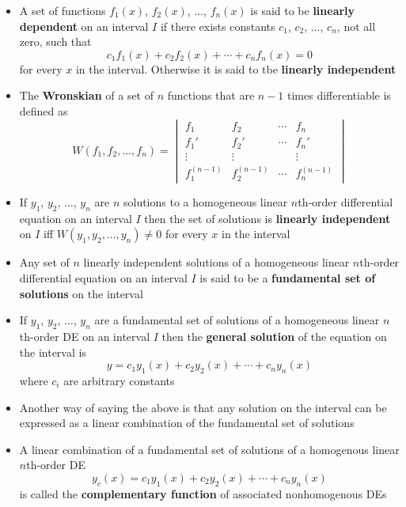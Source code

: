 \documentclass{article}
\begin{document}
\begin{itemize}
  \item A set of functions $f_1(x)$, $f_2(x)$, $\ldots$, $f_n(x)$ is said to be \textbf{linearly dependent} on an interval $I$ if there exists constants $c_1$, $c_2$, $\ldots$, $c_n$, not all zero, such that \[c_1 f_1(x) + c_2 f_2(x) + \cdots + c_n f_n(x) = 0\] for every $x$ in the interval. Otherwise it is said to tbe \textbf{linearly independent}

  \item The \textbf{Wronskian} of a set of $n$ functions that are $n - 1$ times differentiable is defined as \[W(f_1, f_2, \ldots, f_n) = \begin{vmatrix}
            f_1           & f_2           & \cdots & f_n           \\
            f_1'          & f_2'          & \cdots & f_n'          \\
            \vdots        & \vdots        &        & \vdots        \\
            f_1^{(n - 1)} & f_2^{(n - 1)} & \cdots & f_n^{(n - 1)}
          \end{vmatrix}\]

  \item If $y_1$, $y_2$, $\ldots$, $y_n$ are $n$ solutions to a homogeneous linear $n$th-order differential equation on an interval $I$ then the set of solutions is \textbf{linearly independent} on $I$ iff $W(y_1, y_2, \ldots, y_n) \ne 0$ for every $x$ in the interval

  \item Any set of $n$ linearly independent solutions of a homogeneous linear $n$th-order differential equation on an interval $I$ is said to be a \textbf{fundamental set of solutions} on the interval

  \item If $y_1$, $y_2$, $\ldots$, $y_n$ are a fundamental set of solutions of a homogeneous linear $n$th-order DE on an interval $I$ then the \textbf{general solution} of the equation on the interval is \[y = c_1 y_1(x) + c_2 y_2(x) + \cdots + c_n y_n(x)\] where $c_i$ are arbitrary constants

  \item Another way of saying the above is that any solution on the interval can be expressed as a linear combination of the fundamental set of solutions

  \item A linear combination of a fundamental set of solutions of a homogenous linear $n$th-order DE \[y_c(x) = c_1 y_1(x) + c_2 y_2(x) + \cdots + c_n y_n(x)\] is called the \textbf{complementary function} of associated nonhomogenous DEs


\end{itemize}
\end{document}
